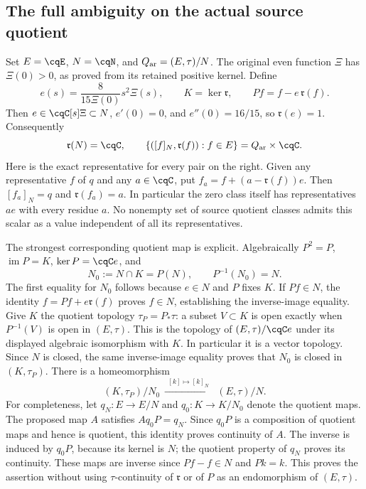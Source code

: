 \subsection{The full ambiguity on the actual source quotient}
Set $E=\cqE$, $N=\cqN$, and $Q_{\rm ar}=(E,\tau)/N$.
The original even function $\Xi$ has $\Xi(0)>0$, as proved
from its retained positive kernel. Define
\begin{equation}
 e(s)=\frac{8}{15\Xi(0)}s^2\Xi(s),\qquad
 K=\ker\mathfrak r,\qquad P f=f-e\,\mathfrak r(f).
 \label{eq:cq-residue-section}
\end{equation}
Then $e\in\cqC[s]\Xi\subset N$, $e'(0)=0$, and
$e''(0)=16/15$, so $\mathfrak r(e)=1$.
Consequently
\begin{equation}
 \mathfrak r(N)=\cqC,\qquad
 \{([f]_N,\mathfrak r(f)):f\in E\}
       =Q_{\rm ar}\times\cqC .
 \label{eq:cq-source-residue-full-ambiguity}
\end{equation}
Here is the exact representative for every pair on the right.
Given any representative $f$ of $q$ and any $a\in\cqC$, put
$f_a=f+(a-\mathfrak r(f))e$. Then $[f_a]_N=q$ and
$\mathfrak r(f_a)=a$. In particular the zero class itself has
representatives $ae$ with every residue $a$. No nonempty set of
source quotient classes admits this scalar as a value independent
of all its representatives.

The strongest corresponding quotient map is explicit. Algebraically
$P^2=P$, $\operatorname{im}P=K$, $\ker P=\cqC e$, and
\[
 N_0:=N\cap K=P(N),\qquad P^{-1}(N_0)=N .
\]
The first equality for $N_0$ follows because $e\in N$ and
$P$ fixes $K$. If $Pf\in N$, the identity
$f=Pf+e\mathfrak r(f)$ proves $f\in N$, establishing the
inverse-image equality. Give $K$ the quotient topology
$\tau_P=P_*\tau$: a subset $V\subset K$ is open exactly when
$P^{-1}(V)$ is open in $(E,\tau)$. This is the topology of
$(E,\tau)/\cqC e$ under its displayed algebraic isomorphism
with $K$. In particular it is a vector topology. Since $N$ is
closed, the same inverse-image equality proves that $N_0$ is
closed in $(K,\tau_P)$. There is a homeomorphism
\begin{equation}
 (K,\tau_P)/N_0
    \ \xrightarrow{\ \ [k]\mapsto[k]_N\ \ }\
    (E,\tau)/N .
 \label{eq:cq-source-residue-reduced-quotient}
\end{equation}
For completeness, let $q_N:E\to E/N$ and
$q_0:K\to K/N_0$ denote the quotient maps. The proposed map
$A$ satisfies $Aq_0P=q_N$. Since $q_0P$ is a composition
of quotient maps and hence is quotient, this identity proves
continuity of $A$. The inverse is induced by $q_0P$, because
its kernel is $N$; the quotient property of $q_N$ proves its
continuity. These maps are inverse since
$P f-f\in N$ and $P k=k$. This proves the assertion without
using $\tau$-continuity of $\mathfrak r$ or of $P$ as an
endomorphism of $(E,\tau)$.

